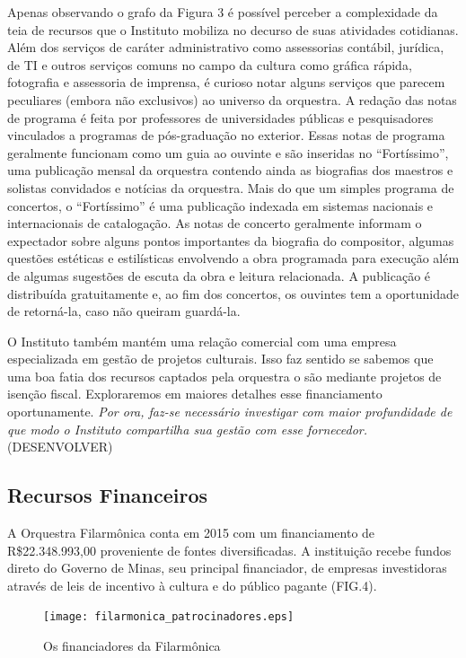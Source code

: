 \documentclass[a4paper, 12pt, openright, oneside, german, french, english, brazil]{abntex2}
\begin{document}
	Apenas observando o grafo da Figura 3 é possível perceber a complexidade da teia de recursos que o Instituto mobiliza no decurso de suas atividades cotidianas. Além dos serviços de caráter administrativo como assessorias contábil, jurídica, de TI e outros serviços comuns no campo da cultura como gráfica rápida, fotografia e assessoria de imprensa, é curioso notar alguns serviços que parecem peculiares (embora não exclusivos) ao universo da orquestra. A redação das notas de programa é feita por professores de universidades públicas e pesquisadores vinculados a programas de pós-graduação no exterior. Essas notas de programa geralmente funcionam como um guia ao ouvinte e são inseridas no ``Fortíssimo'', uma publicação mensal da orquestra contendo ainda as biografias dos maestros e solistas convidados e notícias da orquestra. Mais do que um simples programa de concertos, o ``Fortíssimo'' é uma publicação indexada em sistemas nacionais e internacionais de catalogação. As notas de concerto geralmente informam o expectador sobre alguns pontos importantes da biografia do compositor, algumas questões estéticas e estilísticas envolvendo a obra programada para execução além de algumas sugestões de escuta da obra e leitura relacionada. A publicação é distribuída gratuitamente e, ao fim dos concertos, os ouvintes tem a oportunidade de retorná-la, caso não queiram guardá-la.
	
	O Instituto também mantém uma relação comercial com uma empresa especializada em gestão de projetos culturais. Isso faz sentido se sabemos que uma boa fatia dos recursos captados pela orquestra o são mediante projetos de isenção fiscal. Exploraremos em maiores detalhes esse financiamento oportunamente. \textit{Por ora, faz-se necessário investigar com maior profundidade de que modo o Instituto compartilha sua gestão com esse fornecedor.} (DESENVOLVER)
	
	\subsection{Recursos Financeiros}
	
	A Orquestra Filarmônica conta em 2015 com um financiamento de R\$22.348.993,00 proveniente de fontes diversificadas. A instituição recebe fundos direto do Governo de Minas, seu principal financiador, de empresas investidoras através de leis de incentivo à cultura e do público pagante (FIG.4).
	
	\begin{figure}[t]
		\begin{center}
			
			\caption{Os financiadores da Filarmônica}
			\begin{center}
				\texttt{[image: filarmonica\_patrocinadores.eps]}
			\end{center}
		\end{center}
	\end{figure}
	
\end{document}
